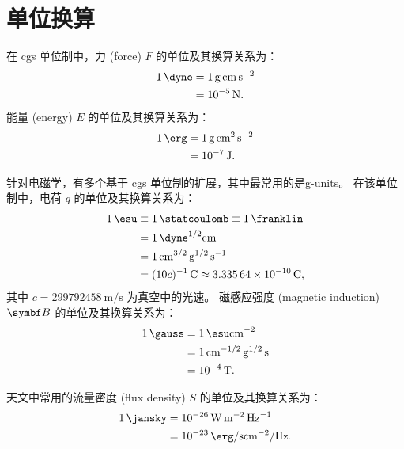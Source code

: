 
\chapter{单位换算}
\label{chap:units}

在 \ac{cgs} 单位制中，力 (force) $F$ 的单位及其换算关系为：
\begin{align}
  \label{eq:cgs-force}
  \SI{1}{\dyne}
    & = \SI{1}{\gram \cm \second\tothe{-2}} \\
    & = \SI{e-5}{\newton} .
\end{align}
能量 (energy) $E$ 的单位及其换算关系为：
\begin{align}
  \label{eq:cgs-work}
  \SI{1}{\erg}
    & = \SI{1}{\gram \cm\tothe{2} \second\tothe{-2}} \\
    & = \SI{e-7}{\joule} .
\end{align}

针对电磁学，有多个基于 \ac{cgs} 单位制的扩展，其中最常用的是\ac{g-units}。
在该单位制中，电荷 $q$ 的单位及其换算关系为：
\begin{align}
  \label{eq:gu-electrical-charge}
  \SI{1}{\esu}
    & \equiv \SI{1}{\statcoulomb} \equiv \SI{1}{\franklin} \\
    & = \SI{1}{\dyne\tothe{1/2} \cm} \\
    & = \SI{1}{\cm\tothe{3/2} \gram\tothe{1/2} \per\second} \\
    & = (10 c)^{-1}\,\si{\coulomb} \approx \SI{3.33564e-10}{\coulomb} ,
\end{align}
其中 $c = \SI{299792458}{\meter\per\second} $ 为真空中的光速。
磁感应强度 (magnetic induction) $\B{B}$ 的单位及其换算关系为：
\begin{align}
  \label{eq:gu-b-field}
  \SI{1}{\gauss}
    & = \SI{1}{\esu \cm\tothe{-2}} \\
    & = \SI{1}{\cm\tothe{-1/2} \gram\tothe{1/2} \second} \\
    & = \SI{e-4}{\tesla} .
\end{align}

天文中常用的流量密度 (flux density) $S$ 的单位及其换算关系为：
\begin{align}
  \label{eq:jy-conv}
  \SI{1}{\jansky}
    & = \SI{e-26}{\watt \meter\tothe{-2} \per\hertz} \\
    & = \SI{e-23}{\erg \per\second \cm\tothe{-2} \per\hertz} .
\end{align}


